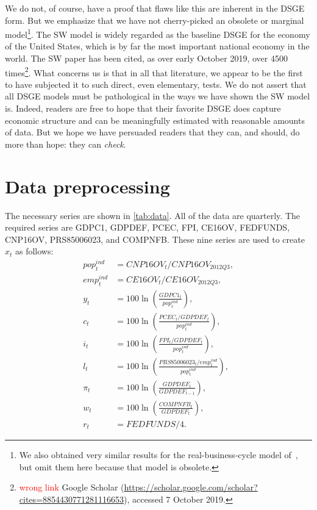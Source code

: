 \documentclass[11pt]{article}
\newcommand{\attn}[1]{\textcolor{red}{#1}}
\begin{document}
We do not, of course, have a proof that flaws like this are inherent in
the DSGE form. But we emphasize that we have not cherry-picked an
obsolete or marginal
model\footnote{We also obtained very similar results for the
  real-business-cycle model of~\citet{KydlandPrescott1982}, but omit
  them here because that model is obsolete.}. The SW model is widely
regarded as the baseline DSGE for the economy of the United States,
which is by far the most important national economy in the world. The SW
paper has been cited, as over early October 2019, over 4500
times\footnote{\attn{wrong link} Google Scholar
  (\url{https://scholar.google.com/scholar?cites=8854430771281116653}),
  accessed 7 October 2019.}. What concerns us is that in all that
literature, we appear to be the first to have subjected it to such
direct, even elementary, tests. We do not assert that all DSGE models
must be pathological in the ways we have shown the SW model is. Indeed,
readers are free to hope that their favorite DSGE does capture economic
structure and can be meaningfully estimated with reasonable amounts of
data. But we hope we have persuaded readers that they can, and should,
do more than hope: they can \emph{check}.

\clearpage

\appendix

\hypertarget{sec:data-preprocessing}{%
\section{Data preprocessing}\label{sec:data-preprocessing}}

\footnotesize

The necessary series are shown in \autoref{tab:data}. All of the data
are quarterly. The required series are GDPC1, GDPDEF, PCEC, FPI, CE16OV,
FEDFUNDS, CNP16OV, PRS85006023, and COMPNFB. These nine series are used
to create \(x_t\) as follows: \begin{align*}
  pop_t^{ind} &= CNP16OV_t / CNP16OV_{2012Q3},\\
  emp_t^{ind} &= CE16OV_t / CE16OV_{2012Q3},\\
  y_t &= 100\ln\left(\frac{GDPC1_t}{pop_t^{ind}}\right),\\
  c_t &= 100\ln\left(\frac{PCEC_t/GDPDEF_t}{pop_t^{ind}}\right),\\
  i_t &= 100\ln\left(\frac{FPI_t/GDPDEF_t}{pop_t^{ind}}\right),\\
  l_t &=
        100\ln\left(\frac{PRS85006023_t/emp_t^{ind}}{pop_t^{ind}}\right),\\
  \pi_t &= 100\ln\left(\frac{GDPDEF_t}{GDPDEF_{t-1}}\right),\\
  w_t &= 100\ln\left(\frac{COMPNFB_t}{GDPDEF_t}\right),\\
  r_t &= FEDFUNDS/4.
\end{align*}
\end{document}
